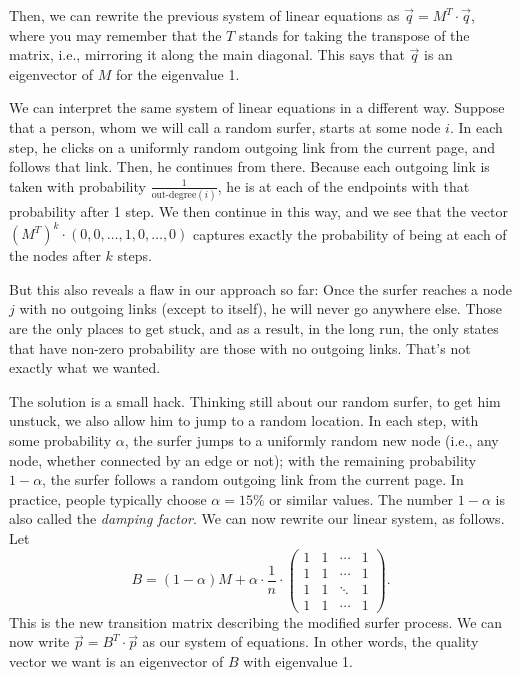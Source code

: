 Then, we can rewrite the previous system of linear equations as 
$\vec{q} = M^T \cdot \vec{q}$, where you may remember that the $T$
stands for taking the transpose of the matrix, i.e., mirroring it
along the main diagonal. This says that $\vec{q}$ is an eigenvector of
$M$ for the eigenvalue 1.

We can interpret the same system of linear equations in a different
way. Suppose that a person, whom we will call a random surfer, starts
at some node $i$. In each step, he clicks on a uniformly random
outgoing link from the current page, and follows that link. Then, he
continues from there. Because each outgoing link is taken with
probability $\frac{1}{\text{out-degree}(i)}$, he is at each of the
endpoints with that probability after 1 step. We then continue in this
way, and we see that the vector $(M^T)^k \cdot (0, 0, \ldots, 1, 0,
\ldots, 0)$ captures exactly the probability of being at each of the
nodes after $k$ steps. 

But this also reveals a flaw in our approach so far: Once the surfer
reaches a node $j$ with no outgoing links (except to itself), he will
never go anywhere else. Those are the only places to get stuck, and as
a result, in the long run, the only states that have non-zero
probability are those with no outgoing links. That's not exactly what
we wanted.

The solution is a small hack. Thinking still about our random surfer,
to get him unstuck, we also allow him to jump to a random location.
In each step, with some probability $\alpha$, the surfer jumps to a
uniformly random new node (i.e., any node, whether connected by an
edge or not); with the remaining probability $1-\alpha$, the surfer
follows a random outgoing link from the current page.
In practice, people typically choose $\alpha = 15\%$ or similar
values. The number $1-\alpha$ is also called the \emph{damping factor}.
We can now rewrite our linear system, as follows. Let 
\[ B = (1-\alpha) M + \alpha \cdot \frac{1}{n} \cdot \left(
  \begin{array}{cccc} 1 & 1 & \cdots & 1 \\ 1 & 1 & \cdots & 1\\
                      1 & 1 & \ddots & 1 \\ 1 & 1 & \cdots & 1
                    \end{array} \right).
\]
This is the new transition matrix describing the modified surfer
process. We can now write $\vec{p} = B^T \cdot \vec{p}$ as our system
of equations. In other words, the quality vector we want is an
eigenvector of $B$ with eigenvalue 1.

